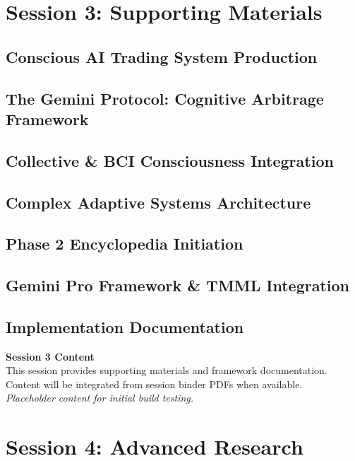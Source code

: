 \documentclass[12pt,oneside]{book}
\begin{document}
\part*{Session 3: Supporting Materials}
\chapter{Conscious AI Trading System Production}
\chapter{The Gemini Protocol: Cognitive Arbitrage Framework}
\chapter{Collective \& BCI Consciousness Integration}
\chapter{Complex Adaptive Systems Architecture}
\chapter{Phase 2 Encyclopedia Initiation}
\chapter{Gemini Pro Framework \& TMML Integration}
\chapter{Implementation Documentation}

\vspace{2cm}
\begin{center}
{\Large \textbf{Session 3 Content}}\\[12pt]
{\normalsize This session provides supporting materials and framework documentation.}\\
{\normalsize Content will be integrated from session binder PDFs when available.}\\[12pt]
{\itshape Placeholder content for initial build testing.}
\end{center}
\newpage

\part*{Session 4: Advanced Research}
\end{document}
